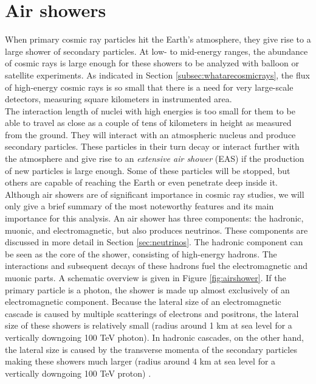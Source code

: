 \section{Air showers}
\label{sec:airshowers}
When primary cosmic ray particles hit the Earth's atmosphere, they give rise to a large shower of secondary particles. At low- to mid-energy ranges, the abundance of cosmic rays is large enough for these showers to be analyzed with balloon or satellite experiments. As indicated in Section \ref{subsec:whatarecosmicrays}, the flux of high-energy cosmic rays is so small that there is a need for very large-scale detectors, measuring square kilometers in instrumented area.\\
\newline
The interaction length of nuclei with high energies is too small for them to be able to travel as close as a couple of tens of kilometers in height as measured from the ground. They will interact with an atmospheric nucleus and produce secondary particles.
These particles in their turn decay or interact further with the atmosphere and give rise to an \textit{extensive air shower} (EAS) if the production of new particles is large enough. Some of these particles will be stopped, but others are capable of reaching the Earth or even penetrate deep inside it. 
Although air showers are of significant importance in cosmic ray studies, we will only give a brief summary of the most noteworthy features and its main importance for this analysis.
An air shower has three components: the hadronic, muonic, and electromagnetic, but also produces neutrinos. These components are discussed in more detail in Section \ref{sec:neutrinos}. The hadronic component can be seen as the core of the shower, consisting of high-energy hadrons. The interactions and subsequent decays of these hadrons fuel the electromagnetic and muonic parts. A schematic overview is given in Figure \ref{fig:airshower}. If the primary particle is a photon, the shower is made up almost exclusively of an electromagnetic component. Because the lateral size of an electromagnetic cascade is caused by multiple scatterings of electrons and positrons, the lateral size of these showers is relatively small (radius around 1 km at sea level for a vertically downgoing 100 TeV photon). In hadronic cascades, on the other hand, the lateral size is caused by the transverse momenta of the secondary particles making these showers much larger (radius around 4 km at sea level for a vertically downgoing 100 TeV proton) \cite{Grupen:2005rx}.

